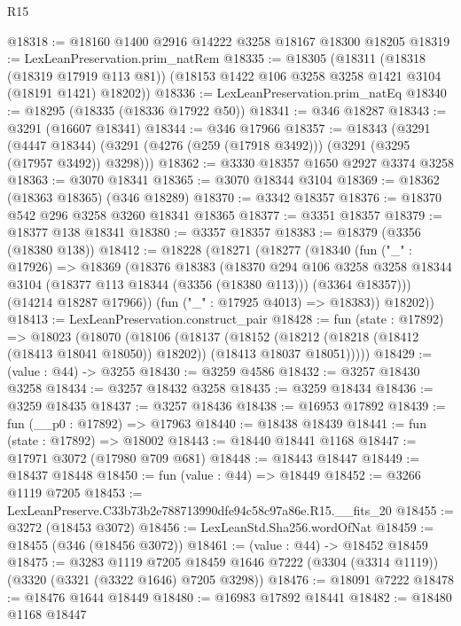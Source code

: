 \begin{lexlean}{R15}
\begin{coremodule}
@18318 := @18160 @1400 @2916 @14222 @3258 @18167 @18300 @18205
@18319 := LexLeanPreservation.prim_natRem
@18335 := @18305
    (@18311
      (@18318 (@18319 @17919 @113 @81))
      (@18153 @1422 @106 @3258 @3258 @1421 @3104 (@18191 @1421) @18202))
@18336 := LexLeanPreservation.prim_natEq
@18340 := @18295 (@18335 (@18336 @17922 @50))
@18341 := @346 @18287
@18343 := @3291 (@16607 @18341)
@18344 := @346 @17966
@18357 := @18343
    (@3291
      (@4447 @18344)
      (@3291 (@4276 (@259 (@17918 @3492))) (@3291 (@3295 (@17957 @3492)) @3298)))
@18362 := @3330 @18357 @1650 @2927 @3374 @3258
@18363 := @3070 @18341
@18365 := @3070 @18344 @3104
@18369 := @18362 (@18363 @18365) (@346 @18289)
@18370 := @3342 @18357
@18376 := @18370 @542 @296 @3258 @3260 @18341 @18365
@18377 := @3351 @18357
@18379 := @18377 @138 @18341
@18380 := @3357 @18357
@18383 := @18379 (@3356 (@18380 @138))
@18412 := @18228
    (@18271
      (@18277
        (@18340
          (fun ("_" : @17926) =>
          @18369
            (@18376
              @18383
              (@18370
                @294
                @106
                @3258
                @3258
                @18344
                @3104
                (@18377 @113 @18344 (@3356 (@18380 @113)))
                (@3364 @18357)))
            (@14214 @18287 @17966))
          (fun ("_" : @17925 @4013) => @18383))
        @18202))
@18413 := LexLeanPreservation.construct_pair
@18428 := fun (state : @17892) =>
  @18023
    (@18070
      (@18106
        (@18137
          (@18152
            (@18212 (@18218 (@18412 (@18413 @18041 @18050)) @18202))
            (@18413 @18037 @18051)))))
@18429 := (value : @44) -> @3255
@18430 := @3259 @4586
@18432 := @3257 @18430 @3258
@18434 := @3257 @18432 @3258
@18435 := @3259 @18434
@18436 := @3259 @18435
@18437 := @3257 @18436
@18438 := @16953 @17892
@18439 := fun (__p0 : @17892) => @17963
@18440 := @18438 @18439
@18441 := fun (state : @17892) => @18002
@18443 := @18440 @18441 @1168
@18447 := @17971 @3072 (@17980 @709 @681)
@18448 := @18443 @18447
@18449 := @18437 @18448
@18450 := fun (value : @44) => @18449
@18452 := @3266 @1119 @7205
@18453 := LexLeanPreserve.C33b73b2e788713990dfe94c58c97a86e.R15.__fits_20
@18455 := @3272 (@18453 @3072)
@18456 := LexLeanStd.Sha256.wordOfNat
@18459 := @18455 (@346 (@18456 @3072))
@18461 := (value : @44) -> @18452 @18459
@18475 := @3283
    @1119
    @7205
    @18459
    @1646
    @7222
    (@3304 (@3314 @1119))
    (@3320 (@3321 (@3322 @1646) @7205 @3298))
@18476 := @18091 @7222
@18478 := @18476 @1644 @18449
@18480 := @16983 @17892 @18441
@18482 := @18480 @1168 @18447

\end{coremodule}
\end{lexlean}
